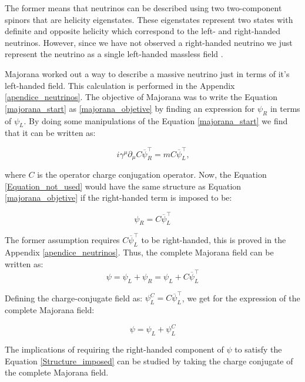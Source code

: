 The former means that neutrinos can be described using two two-component spinors that are helicity eigenstates. These eigenstates represent two states 
with definite and opposite helicity which correspond to the left- and right-handed neutrinos. However, since we have not observed a right-handed neutrino 
we just represent the neutrino as a single left-handed massless field \cite{Theory_neutrinos}.

Majorana worked out a way to describe a massive neutrino just in terms of it's left-handed field.
This calculation is performed in the Appendix \ref{apendice_neutrinos}. The objective of Majorana was to write the Equation
\ref{majorana_start} as \ref{majorana_objetive} by finding an expression for $\psi_R$ in terms of $\psi_L$. By doing some manipulations of the Equation \ref{majorana_start} we 
find that it can be written as:  

\begin{equation} \label{Equation_not_used}
i \gamma^\mu \partial_\mu C \overline{\psi}^\intercal_R = m C \overline{\psi}^{\intercal}_L \text{,}
\end{equation}

where $C$ is the operator charge conjugation operator. Now, the Equation \ref{Equation_not_used} would have the same structure
as Equation \ref{majorana_objetive} if the right-handed term is imposed to be:

\begin{equation} 
\label{Expression_right_handed}
\psi_R = C \overline{\psi}^\intercal_L
\end{equation}

The former assumption requires $C \overline{\psi}^\intercal_L$ to be right-handed, this is proved in the Appendix \ref{apendice_neutrinos}. Thus, the complete Majorana 
field can be written as:
\begin{equation}
\psi = \psi_L + \psi_R = \psi_L + C \overline{\psi}^\intercal_L
\end{equation}

Defining the charge-conjugate field as: $\psi^C_L = C \overline{\psi}^\intercal_L$, we get for the expression of the complete Majorana field:

\begin{equation} \label{Structure_imposed}
\psi = \psi_L + \psi^C_L
\end{equation}

The implications of requiring the right-handed component of $\psi$ to satisfy the Equation                                                    \ref{Structure_imposed} can be studied by taking the charge conjugate of the complete Majorana field. 

